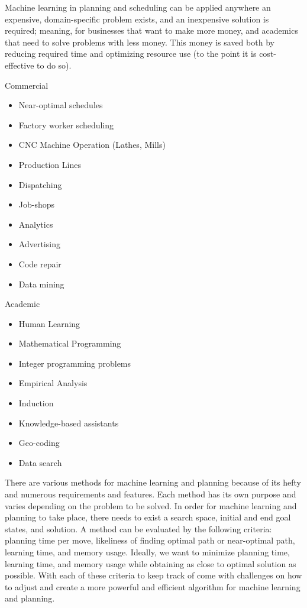 \documentclass[tog]{acmsiggraph}
\begin{document}
Machine learning in planning and scheduling can be applied anywhere an
expensive, domain-specific problem exists, and an inexpensive solution
is required; meaning, for businesses that want to make more money, and
academics that need to solve problems with less money. This money is
saved both by reducing required time and optimizing resource use (to
the point it is cost-effective to do so).

Commercial
\begin{itemize}
\item Near-optimal schedules
\item Factory worker scheduling
\item CNC Machine Operation (Lathes, Mills)
\item Production Lines
\item Dispatching
\item Job-shops
\item Analytics
\item Advertising
\item Code repair
\item Data mining
\end{itemize}
Academic
\begin{itemize}
\item Human Learning
\item Mathematical Programming
\item Integer programming problems
\item Empirical Analysis
\item Induction
\item Knowledge-based assistants
\item Geo-coding
\item Data search
\end{itemize}

There are various methods for machine learning and planning because of
its hefty and numerous requirements and features. Each method has its
own purpose and varies depending on the problem to be solved. In order
for machine learning and planning to take place, there needs to exist
a search space, initial and end goal states, and solution. A method
can be evaluated by the following criteria: planning time per move,
likeliness of finding optimal path or near-optimal path, learning
time, and memory usage. Ideally, we want to minimize planning time,
learning time, and memory usage while obtaining as close to optimal
solution as possible. With each of these criteria to keep track of
come with challenges on how to adjust and create a more powerful and
efficient algorithm for machine learning and planning.
\end{document}
